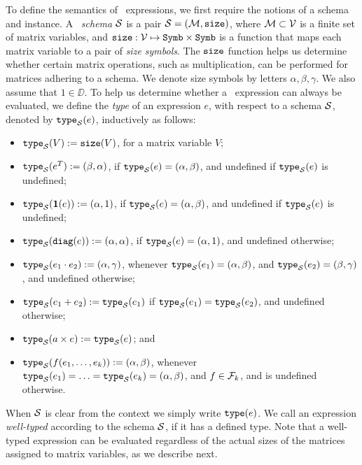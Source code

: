 To define the semantics of \lang\ expressions, we first require the notions 
of a schema and instance. A \lang\ \textit{schema} $\mathcal{S}$ is a pair $\mathcal{S}=(\mathcal{M},\texttt{size})$, where $\mathcal{M}\subset \mathcal{V}$ is a finite set of matrix variables, and $\texttt{size}: \mathcal{V} \mapsto \texttt{Symb}\times \texttt{Symb}$ is a function that maps each matrix variable to a pair of \textit{size symbols}. The $\texttt{size}$ function helps us determine whether certain matrix operations, such as multiplication, can be performed for matrices adhering to a schema. 
We denote size symbols by letters $\alpha,\beta,\gamma$. We also assume that $1\in \DD$. 
To help us determine whether a \lang\ expression can always be evaluated, we define the \textit{type} of an expression $e$, with respect to a schema $\mathcal{S}$, denoted by $\texttt{type}_{\mathcal{S}}(e)$, inductively as follows:
\begin{itemize}
\item $\texttt{type}_{\mathcal{S}}(V):= \texttt{size}(V)$, for a matrix variable $V$;
\item $\texttt{type}_{\mathcal{S}}(e^T):= (\beta,\alpha)$, if $\texttt{type}_{\mathcal{S}}(e)=(\alpha,\beta)$, and undefined if $\texttt{type}_{\mathcal{S}}(e)$ is undefined;
\item $\texttt{type}_{\mathcal{S}}(\mathbf{1}(e)):= (\alpha,1)$, if $\texttt{type}_{\mathcal{S}}(e)=(\alpha,\beta)$, and undefined if $\texttt{type}_{\mathcal{S}}(e)$ is undefined;
\item $\texttt{type}_{\mathcal{S}}(\texttt{diag}(e)):= (\alpha,\alpha)$, if $\texttt{type}_{\mathcal{S}}(e)=(\alpha,1)$, and undefined otherwise;
\item $\texttt{type}_{\mathcal{S}}(e_1 \cdot e_2):= (\alpha,\gamma)$, whenever $\texttt{type}_{\mathcal{S}}(e_1)=(\alpha,\beta)$, and $\texttt{type}_{\mathcal{S}}(e_2)=(\beta,\gamma)$, and undefined otherwise;
\item $\texttt{type}_{\mathcal{S}}(e_1 + e_2):=\texttt{type}_{\mathcal{S}}(e_1)$ if $\texttt{type}_{\mathcal{S}}(e_1)=\texttt{type}_{\mathcal{S}}(e_2)$, and undefined otherwise;
\item $\texttt{type}_{\mathcal{S}}(a\times e):=\texttt{type}_{\mathcal{S}}(e)$; and
\item $\texttt{type}_{\mathcal{S}}(f(e_1,\ldots ,e_k)):= (\alpha,\beta)$, whenever $\texttt{type}_{\mathcal{S}}(e_1) = \ldots = \texttt{type}_{\mathcal{S}}(e_k) = (\alpha,\beta)$, and $f\in\mathcal{F}_k$, and is undefined otherwise.
\end{itemize}
When $\mathcal{S}$ is clear from the context we simply write $\texttt{type}(e)$. We call an expression \textit{well-typed} according to the schema $\mathcal{S}$, if it has a defined type. 
Note that a well-typed expression can be evaluated regardless of the actual sizes of the matrices assigned to matrix variables, as we describe next.

